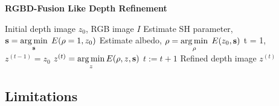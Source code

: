 \begin{algorithm}[!htbp]
	\begin{algorithmic}[1]
  		\caption{\textbf{RGBD-Fusion Like Depth Refinement}}
		\label{alg:rgbd_fusion}
		 \renewcommand{\algorithmicrequire}{\textbf{Input:}}
		 \renewcommand{\algorithmicensure}{\textbf{Output:}}
		 \REQUIRE Initial depth image $z_0$, RGB image $I$
		 \vspace{1.8mm}
		 \STATE Estimate SH parameter, $\mathbf{s} = \operatorname*{arg\,min} \limits_{\mathbf{s}} \; E(\rho = 1, z_0)$ 
		 \STATE Estimate albedo, $\rho = \operatorname*{arg\,min} \limits_{\rho} \; E(z_0, \mathbf{s})$ 
		 \STATE t = 1, $z^{(t-1)} = z_0$
		 \vspace{1.8mm}
		   \vspace{1.8mm}
			  \STATE $z^{(t)} = \operatorname*{arg\,min} \limits_{z} E(\rho, z, \mathbf{s})$ 
		          \STATE $t := t + 1$
		 \vspace{1.8mm}
		  \ENDWHILE
		  \ENSURE  Refined depth image $z^{(t)}$
	\end{algorithmic}
\end{algorithm}


\subsection{Limitations}

